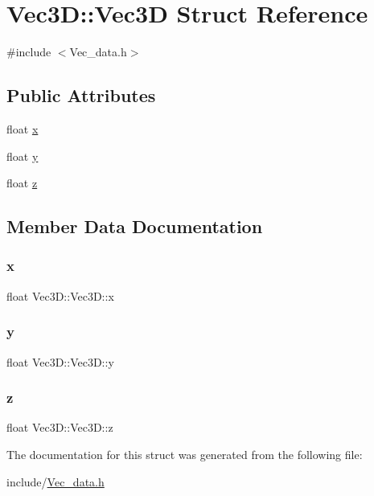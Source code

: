 \hypertarget{struct_vec3_d_1_1_vec3_d}{}\section{Vec3D\+:\+:Vec3D Struct Reference}
\label{struct_vec3_d_1_1_vec3_d}


{\ttfamily \#include $<$Vec\+\_\+data.\+h$>$}

\subsection*{Public Attributes}
\begin{DoxyCompactItemize}
\item 
float \mbox{\hyperlink{struct_vec3_d_1_1_vec3_d_af6c8441d18cf30fc8fc3c64093d7693a}{x}}
\item 
float \mbox{\hyperlink{struct_vec3_d_1_1_vec3_d_acf24a22b67cb543ffd2b2ed9bdfd6459}{y}}
\item 
float \mbox{\hyperlink{struct_vec3_d_1_1_vec3_d_aa00bc72d62451a6602b1ab0bfc2fa2f9}{z}}
\end{DoxyCompactItemize}


\subsection{Member Data Documentation}
\mbox{\label{struct_vec3_d_1_1_vec3_d_af6c8441d18cf30fc8fc3c64093d7693a}} 
\subsubsection{\texorpdfstring{x}{x}}
{\footnotesize\ttfamily float Vec3\+D\+::\+Vec3\+D\+::x}

\mbox{\label{struct_vec3_d_1_1_vec3_d_acf24a22b67cb543ffd2b2ed9bdfd6459}} 
\subsubsection{\texorpdfstring{y}{y}}
{\footnotesize\ttfamily float Vec3\+D\+::\+Vec3\+D\+::y}

\mbox{\label{struct_vec3_d_1_1_vec3_d_aa00bc72d62451a6602b1ab0bfc2fa2f9}} 
\subsubsection{\texorpdfstring{z}{z}}
{\footnotesize\ttfamily float Vec3\+D\+::\+Vec3\+D\+::z}



The documentation for this struct was generated from the following file\+:\begin{DoxyCompactItemize}
\item 
include/\mbox{\hyperlink{_vec__data_8h}{Vec\+\_\+data.\+h}}\end{DoxyCompactItemize}
